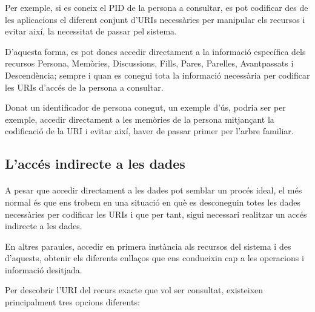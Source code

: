        Per exemple, si es coneix el PID de la persona a consultar, es pot codificar des de les aplicacions el diferent conjunt d'URIs necessàries per manipular els recursos i evitar així, la necessitat de passar pel sistema.

        D'aquesta forma, es pot doncs accedir directament a la informació específica dels recursos Persona, Memòries, Discussions, Fills, Pares, Parelles, Avantpassats i Descendència; sempre i quan es conegui tota la informació necessària per codificar les URIs d'accés de la persona a consultar.

        Donat un identificador de persona conegut, un exemple d'ús, podria ser per exemple, accedir directament a les memòries de la persona mitjançant la codificació de la URI i evitar així, haver de passar primer per l'arbre familiar.


    \subsection{L'accés indirecte a les dades}

        \paragraph{}
        A pesar que accedir directament a les dades pot semblar un procés ideal, el més normal és que ens trobem en una situació en què es desconeguin totes les dades necessàries per codificar les URIs i que per tant, sigui necessari realitzar un accés indirecte a les dades.

        En altres paraules, accedir en primera instància als recursos del sistema i des d'aquests, obtenir els diferents enllaços que ens condueixin cap a les operacions i informació desitjada.

        Per descobrir l’URI del recurs exacte que vol ser consultat, existeixen principalment tres opcions diferents:

